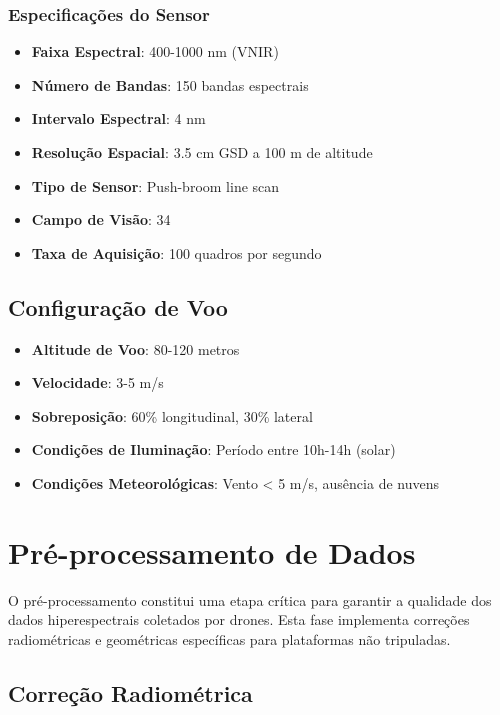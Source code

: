 \subsubsection{Especificações do Sensor}
\begin{itemize}
    \item \textbf{Faixa Espectral}: 400-1000 nm (VNIR)
    \item \textbf{Número de Bandas}: 150 bandas espectrais
    \item \textbf{Intervalo Espectral}: 4 nm
    \item \textbf{Resolução Espacial}: 3.5 cm GSD a 100 m de altitude
    \item \textbf{Tipo de Sensor}: Push-broom line scan
    \item \textbf{Campo de Visão}: 34\textdegree
    \item \textbf{Taxa de Aquisição}: 100 quadros por segundo
\end{itemize}

\subsection{Configuração de Voo}
\begin{itemize}
    \item \textbf{Altitude de Voo}: 80-120 metros
    \item \textbf{Velocidade}: 3-5 m/s
    \item \textbf{Sobreposição}: 60\% longitudinal, 30\% lateral
    \item \textbf{Condições de Iluminação}: Período entre 10h-14h (solar)
    \item \textbf{Condições Meteorológicas}: Vento < 5 m/s, ausência de nuvens
\end{itemize}

\section{Pré-processamento de Dados}\label{sec:preprocessamento}

O pré-processamento constitui uma etapa crítica para garantir a qualidade dos dados hiperespectrais coletados por drones. Esta fase implementa correções radiométricas e geométricas específicas para plataformas não tripuladas.

\subsection{Correção Radiométrica}
